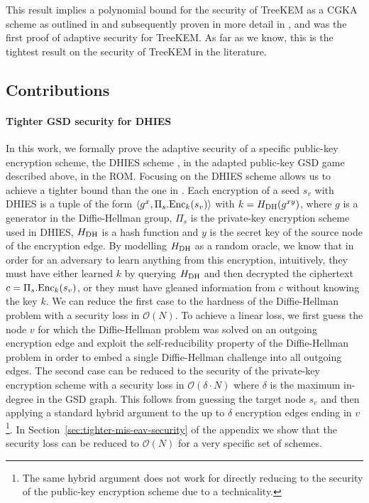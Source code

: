 This result implies a polynomial bound for the security of TreeKEM as a CGKA scheme as outlined in \cite[Theorem 4]{ttkem} and subsequently proven in more detail in \cite[Theorem 12]{modular-group-messaging}, and was the first proof of adaptive security for TreeKEM. As far as we know, this is the tightest result on the security of TreeKEM in the literature.

\subsection{Contributions}

\paragraph{Tighter GSD security for DHIES} In this work, we formally prove the adaptive security of a specific public-key encryption scheme, the DHIES  scheme \cite{dhies}, in the adapted public-key GSD game described above, in the ROM. Focusing on the DHIES scheme allows us to achieve a tighter bound than the one in \cite{ttkem}. Each encryption of a seed $s_v$ with DHIES is a tuple of the form $\langle g^{x}, \Pi_s.\mathrm{Enc}_{k}(s_v) \rangle$ with $k = H_\mathrm{DH}(g^{x y})$, where $g$ is a generator in the Diffie-Hellman group, $\Pi_s$ is the private-key encryption scheme used in DHIES, $H_\mathrm{DH}$ is a hash function and $y$ is the secret key of the source node of the encryption edge. By modelling $H_\mathrm{DH}$ as a random oracle, we know that in order for an adversary to learn anything from this encryption, intuitively, they must have either learned $k$ by querying $H_\mathrm{DH}$ and then decrypted the ciphertext $c = \Pi_s.\mathrm{Enc}_{k}(s_v)$, or they must have gleaned information from $c$ without knowing the key $k$. We can reduce the first case to the hardness of the Diffie-Hellman problem with a security loss in $\mathcal{O}(N)$. To achieve a linear loss, we first guess the node $v$ for which the Diffie-Hellman problem was solved on an outgoing encryption edge and exploit the self-reducibility property of the Diffie-Hellman problem in order to embed a single Diffie-Hellman challenge into all outgoing edges. The second case can be reduced to the security of the private-key encryption scheme with a security loss in $\mathcal{O}(\delta \cdot N)$ where $\delta$ is the maximum in-degree in the GSD graph.
This follows from guessing the target node $s_v$ and then applying a standard hybrid argument to the up to $\delta$ encryption edges ending in $v$\footnote{The same hybrid argument does not work for directly reducing to the security of the public-key encryption scheme due to a technicality.}. In Section~\ref{sec:tighter-mis-eav-security} of the appendix we show that the security loss can be reduced to $\mathcal{O}(N)$ for a very specific set of schemes.

